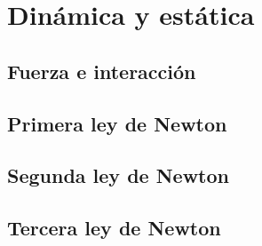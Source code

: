 ﻿\documentclass[11pt,letterpaper,openany]{book}
\newcommand{\rutaraiz}{../..}
\begin{document}




\part{Dinámica y estática}



\chapter{Fuerza e interacción}





\chapter{Primera ley de Newton}





\chapter{Segunda ley de Newton}





\chapter{Tercera ley de Newton}


\end{document}
